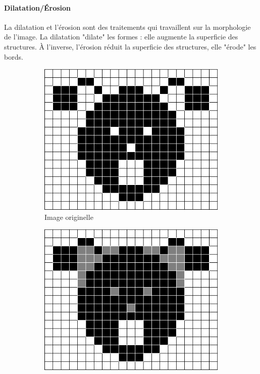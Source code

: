 \documentclass[a4paper, 12pt, titlepage, oneside, french]{article}
\begin{document}
	\paragraph{\textbf{Dilatation/Érosion}}
	La dilatation et l'érosion sont des traitements qui travaillent sur la morphologie de l'image.
	La dilatation "dilate" les formes : elle augmente la superficie des structures.
	À l'inverse, l'érosion réduit la superficie des structures, elle "érode" les bords.
	\begin{figure}[H]
		\centering
		\begin{subfigure}[b]{0.3\linewidth}
			\includegraphics[width=\linewidth]{filter_dilate-erode_ex-base.png}
			\caption{Image originelle}
		\end{subfigure}
		\begin{subfigure}[b]{0.3\linewidth}
			\includegraphics[width=\linewidth]{filter_dilate-erode_ex-dilate.png}

\end{subfigure}
\end{figure}
\end{document}
